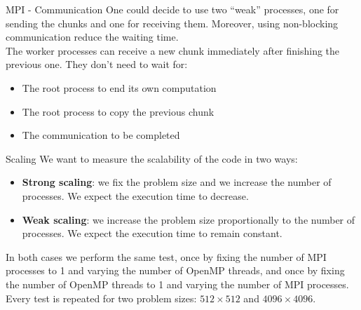 \begin{frame}[fragile,t]{MPI - Communication}
    One could decide to use two \enquote{weak} processes, one
    for sending the chunks and one for receiving them. Moreover,
    using non-blocking communication reduce the waiting time. \\
    The worker processes can receive a new chunk immediately after
    finishing the previous one. They don't need to wait for:
    \begin{itemize}
        \item The root process to end its own computation
        \item The root process to copy the previous chunk
        \item The communication to be completed
    \end{itemize}
\end{frame}

%
%
\begin{frame}[fragile]{Scaling}
    We want to measure the scalability of the code in two ways:
    \begin{itemize}
        \item \textbf{Strong scaling}: we fix the problem size and
        we increase the number of processes. We expect the execution
        time to decrease.
        \item \textbf{Weak scaling}: we increase the problem size
        proportionally to the number of processes. We expect the
        execution time to remain constant.
    \end{itemize}
    In both cases we perform the same test, once by fixing the number
    of MPI processes to 1 and varying the number of OpenMP threads,
    and once by fixing the number of OpenMP threads to 1 and varying
    the number of MPI processes. \\
    Every test is repeated for two problem sizes: $512 \times 512$
    and $4096 \times 4096$.
\end{frame}

